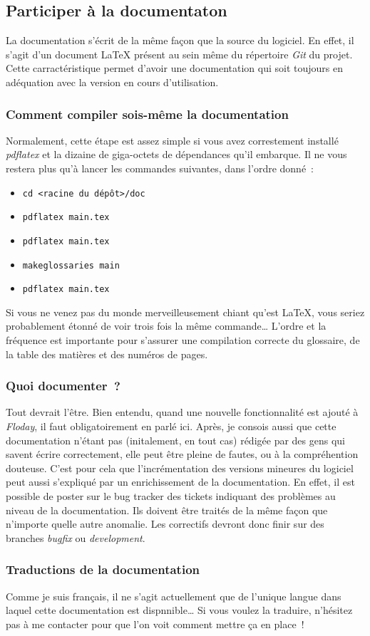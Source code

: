 \subsection{Participer à la documentaton}

La documentation s'écrit de la même façon que la source du logiciel.
En effet, il s'agit d'un document \LaTeX{} présent au sein même du répertoire \emph{Git} du projet.
Cette carractéristique permet d'avoir une documentation qui soit toujours en adéquation avec la version en cours d'utilisation.

\subsubsection{Comment compiler sois-même la documentation}
Normalement, cette étape est assez simple si vous avez correstement installé \emph{pdflatex} et la dizaine de giga-octets de dépendances qu'il embarque.
Il ne vous restera plus qu'à lancer les commandes suivantes, dans l'ordre donné~:
\begin{itemize}
	\item{\tt cd <racine du dépôt>/doc}
	\item{\tt pdflatex main.tex}
	\item{\tt pdflatex main.tex}
	\item{\tt makeglossaries main}
	\item{\tt pdflatex main.tex}
\end{itemize}
Si vous ne venez pas du monde merveilleusement chiant qu'est \LaTeX, vous seriez probablement étonné de voir trois fois la même commande\dots{}
L'ordre et la fréquence est importante pour s'assurer une compilation correcte du glossaire, de la table des matières et des numéros de pages.

\subsubsection{Quoi documenter~?}
Tout devrait l'être.
Bien entendu, quand une nouvelle fonctionnalité est ajouté à \emph{Floday}, il faut obligatoirement en parlé ici.
Après, je consois aussi que cette documentation n'étant pas (initalement, en tout cas) rédigée par des gens qui savent écrire correctement, elle peut être pleine de fautes, ou à la compréhention douteuse.
C'est pour cela que l'incrémentation des versions mineures du logiciel peut aussi s'expliqué par un enrichissement de la documentation.
En effet, il est possible de poster sur le bug tracker des tickets indiquant des problèmes au niveau de la documentation.
Ils doivent être traités de la même façon que n'importe quelle autre anomalie.
Les correctifs devront donc finir sur des branches \emph{bugfix} ou \emph{development}.

\subsubsection{Traductions de la documentation}
Comme je suis français, il ne s'agit actuellement que de l'unique langue dans laquel cette documentation est dispnnible\dots{}
Si vous voulez la traduire, n'hésitez pas à me contacter pour que l'on voit comment mettre ça en place~!
